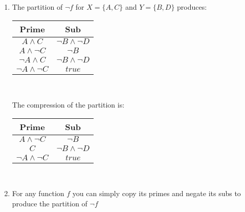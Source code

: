 \documentclass{article}
\begin{document}
\begin{enumerate}
\item The partition of $\lnot f$ for $X = \{A,C\}$ and $Y = \{B, D\}$ produces:
\begin{center}
       \begin{tabular}{ |c|c| }
        \hline
         Prime&Sub \\ 
         \hline
         $A \land C$ & $\lnot B \land \lnot D$ \\
         \hline
         $A \land \lnot C$ & $\lnot B$ \\
         \hline
         $\lnot A \land C$ & $\lnot B \land \lnot D$ \\
         \hline
         $\lnot A \land \lnot C$ & $true$ \\
         \hline
        \end{tabular} \\
\end{center}
The compression of the partition is:
\begin{center}
       \begin{tabular}{ |c|c| }
        \hline
         Prime&Sub \\ 
         \hline
         $A \land \lnot C$ & $\lnot B$ \\
         \hline
         $C$ & $\lnot B \land \lnot D$ \\
         \hline
         $\lnot A \land \lnot C$ & $true$ \\
         \hline
        \end{tabular} \\
\end{center}

\item For any function $f$ you can simply copy its primes and negate its subs to produce the partition of $\lnot f$
\end{enumerate}
   
 \clearpage
 \section{}
 
 \clearpage
 \section{}

 \clearpage
 \section{}
 
 \clearpage
 \section{}

\clearpage
\section{}

\clearpage
\section{}

\clearpage
\section{}
\end{document}
